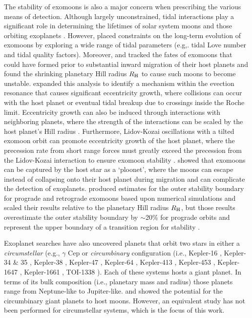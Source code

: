 \documentclass[preprint]{aastex63}
\begin{document}
The stability of exomoons is also a major concern when prescribing the various means of detection.  Although largely unconstrained, tidal interactions play a significant role in determining the lifetimes of solar system moons and those orbiting exoplanets \citep{Barnes2002,lainey2020resonance}.  However, \cite{Sasaki2012,Sasaki2014} placed constraints on the long-term evolution of exomoons by exploring a wide range of tidal parameters (e.g,. tidal Love number and tidal quality factors).  Moreover, \cite{Namouni2010} and {\cite{Trani2020}} tracked the fates of exomoons that could have formed prior to substantial inward migration of their host planets and found the shrinking planetary Hill radius $R_{\rm H}$ to cause such moons to become unstable.  \cite{Spalding2016} expanded this analysis to identify a mechanism within the evection resonance that causes significant eccentricity growth, where collisions can occur with the host planet or eventual tidal breakup due to crossings inside the Roche limit.  Eccentricity growth can also be induced through interactions with neighboring planets, where the strength of the interactions can be scaled by the host planet's Hill radius \citep{Payne2013}.  Furthermore, Lidov-Kozai oscillations with a tilted exomoon orbit can promote eccentricity growth of the host planet, where the precession rate from short range forces must greatly exceed the precession from the Lidov-Kozai interaction to ensure exomoon stability \citep{Grishin2018}.     \cite{Sucerquia2019} showed that exomoons can be captured by the host star as a `ploonet', where the moons can escape instead of collapsing onto their host planet during migration and can complicate the detection of exoplanets.  \cite{Domingos2006} produced estimates for the outer stability boundary for prograde and retrograde exomoons based upon numerical simulations and scaled their results relative to the planetary Hill radius $R_{\rm H}$, but those results overestimate the outer stability boundary by $\sim$20\% for prograde orbits \citep{Rosario-Franco2020} and represent the upper boundary of a transition region for stability \citep{Dvorak1986}.

Exoplanet searches have also uncovered planets that orbit two stars in either a {\it circumstellar} (e.g., $\gamma$ Cep \citep{Campbell1988,Hatzes2003} or {\it circumbinary} configuration (i.e., Kepler-16 \citep{Doyle2011}, Kepler-34 \& 35 \citep{Welsh2012}, Kepler-38 \cite{Orosz2012b}, Kepler-47 \citep{Orosz2012a,Orosz2019}, Kepler-64 \citep{Schwamb2013}, Kepler-413 \citep{Kostov2013}, Kepler-453 \citep{Welsh2012}, Kepler-1647 \citep{Kostov2016}, Kepler-1661 \citep{Socia2020}, TOI-1338 \citep{Kostov2020}).  Each of these systems hosts a giant planet. In terms of its bulk composition (i.e., planetary mass and radius) those planets range from Neptune-like to Jupiter-like.  \cite{Quarles2012} and \cite{Hamers2018a} showed the potential for the circumbinary giant planets to host moons.  However, an equivalent {study} has not been performed for circumstellar systems, which is the focus of this work.
\end{document}
